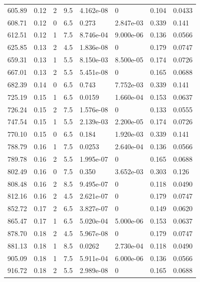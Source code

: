 \documentclass[preview]{standalone}
\begin{document}
{{{\begin{tabular}{L{1.2cm}C{1.2cm} C{0.3cm}C{0.5cm} C{1.4cm}C{1.4cm} C{1.4cm}C{1.4cm}}
  605.89  &  0.12  & 2     & 9.5 &  4.162e-08  & 0  & 0.104 &  0.0433   \\ 
  608.71  &  0.12  & 0     & 6.5 &  0.273  & 2.847e-03  & 0.339 &  0.141   \\ 
  612.51  &  0.12  & 1     & 7.5 &  8.746e-04  & 9.000e-06  & 0.136 &  0.0566   \\ 
  625.85  &  0.13  & 2     & 4.5 &  1.836e-08  & 0  & 0.179 &  0.0747   \\ 
  659.31  &  0.13  & 1     & 5.5 &  8.150e-03  & 8.500e-05  & 0.174 &  0.0726   \\ 
  667.01  &  0.13  & 2     & 5.5 &  5.451e-08  & 0  & 0.165 &  0.0688   \\ 
  682.39  &  0.14  & 0     & 6.5 &  0.743  & 7.752e-03  & 0.339 &  0.141   \\ 
  725.19  &  0.15  & 1     & 6.5 &  0.0159  & 1.660e-04  & 0.153 &  0.0637   \\ 
  726.24  &  0.15  & 2     & 7.5 &  1.576e-08  & 0  & 0.133 &  0.0555   \\ 
  747.54  &  0.15  & 1     & 5.5 &  2.139e-03  & 2.200e-05  & 0.174 &  0.0726   \\ 
  770.10  &  0.15  & 0     & 6.5 &  0.184  & 1.920e-03  & 0.339 &  0.141   \\ 
  788.79  &  0.16  & 1     & 7.5 &  0.0253  & 2.640e-04  & 0.136 &  0.0566   \\ 
  789.78  &  0.16  & 2     & 5.5 &  1.995e-07  & 0  & 0.165 &  0.0688   \\ 
  802.49  &  0.16  & 0     & 7.5 &  0.350  & 3.652e-03  & 0.303 &  0.126   \\ 
  808.48  &  0.16  & 2     & 8.5 &  9.495e-07  & 0  & 0.118 &  0.0490   \\ 
  812.16  &  0.16  & 2     & 4.5 &  2.621e-07  & 0  & 0.179 &  0.0747   \\ 
  852.72  &  0.17  & 2     & 6.5 &  3.827e-07  & 0  & 0.149 &  0.0620   \\ 
  865.47  &  0.17  & 1     & 6.5 &  5.020e-04  & 5.000e-06  & 0.153 &  0.0637   \\ 
  878.70  &  0.18  & 2     & 4.5 &  5.967e-08  & 0  & 0.179 &  0.0747   \\ 
  881.13  &  0.18  & 1     & 8.5 &  0.0262  & 2.730e-04  & 0.118 &  0.0490   \\ 
  905.09  &  0.18  & 1     & 7.5 &  5.911e-04  & 6.000e-06  & 0.136 &  0.0566   \\ 
  916.72  &  0.18  & 2     & 5.5 &  2.989e-08  & 0  & 0.165 &  0.0688   \\ 

\end{tabular}}}}
\end{document}
